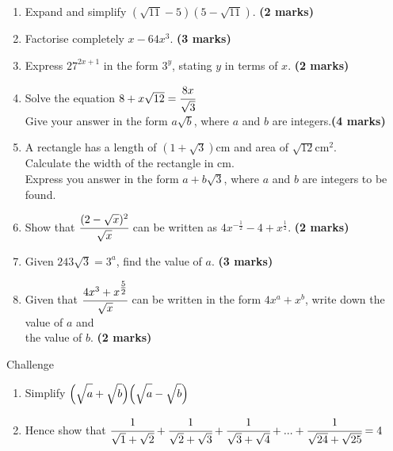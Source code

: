 \documentclass[fleqn]{article}
\begin{document}
\begin{enumerate}
    \item Expand and simplify $(\sqrt{11}-5)(5-\sqrt{11})$. \hfill\textbf{(2 marks)}
    
    \item Factorise completely $x-64x^3$. \hfill\textbf{(3 marks)}
    
    \item Express $27^{2x+1}$ in the form $3^y$, stating $y$ in terms of $x$. \hfill\textbf{(2 marks)}
    
    \item \vspace{-2mm}Solve the equation $8+x\sqrt{12}=\cfrac{8x}{\sqrt{3}}$\\
        Give your answer in the form $a\sqrt{b}$, where $a$ and $b$ are integers.\hfill\textbf{(4 marks)}
    \item A rectangle has a length of $(1+\sqrt{3})$cm and area of $\sqrt{12}$cm$^2$.\\
          Calculate the width of the rectangle in cm.\\
          Express you answer in the form $a+b\sqrt{3}$, where $a$ and $b$ are integers to be found.
    
    \item Show that $\cfrac{(2-\sqrt{x})^2}{\sqrt{x}}$ can be written as $4x^{-\textstyle\frac{1}{2}}-4+x^{\textstyle\frac{1}{2}}$. \hfill\textbf{(2 marks)}
    
    \item Given $243\sqrt{3}=3^a$, find the value of $a$. \hfill\textbf{(3 marks)}
    
    \item \vspace{-1.5mm}Given that $\cfrac{4x^3+x^{\textstyle\frac{5}{2}}}{\sqrt{x}}$ can be written in the form $4x^a+x^b$, write down the value of $a$ and\\ the value of $b$. \hfill\textbf{(2 marks)}
\end{enumerate}


\begin{mybox2}[colbacktitle=green]{Challenge}
    \rmfamily
    \begin{enumerate}[label=\textbf{\alph*}]
        \item Simplify $\Big(\sqrt{\strut a}+\sqrt{\strut b}\Big)\Big(\sqrt{\strut a}-\sqrt{\strut b}\Big)$
        \item \vspace{-2mm}Hence show that $\cfrac{1}{\sqrt{1}+\sqrt{2}}+\cfrac{1}{\sqrt{2}+\sqrt{3}}+\cfrac{1}{\sqrt{3}+\sqrt{4}}+...+\cfrac{1}{\sqrt{24}+\sqrt{25}}=4$
    \end{enumerate}

\end{mybox2}
\end{document}
